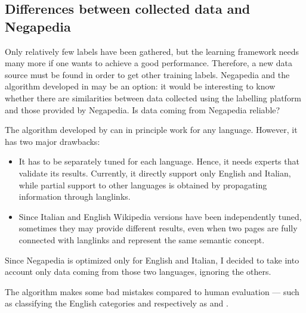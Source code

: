         \subsection{Differences between collected data and Negapedia}
            Only relatively few labels have been gathered, but the learning framework needs many more if one wants to achieve a good performance. Therefore, a new data source must be found in order to get other training labels. Negapedia and the algorithm developed in \cite{Bonetti} may be an option: it would be interesting to know whether there are similarities between data collected using the labelling platform and those provided by Negapedia. Is data coming from Negapedia reliable?
            
            The algorithm developed by \citeauthor{Bonetti} can in principle work for any language. However, it has two major drawbacks:
            \begin{itemize}
                \item It has to be separately tuned for each language. Hence, it needs experts that validate its results. Currently, it directly support only English and Italian, while partial support to other languages is obtained by propagating information through langlinks.
                \item Since Italian and English Wikipedia versions have been independently tuned, sometimes they may provide different results, even when two pages are fully connected with langlinks and represent the same semantic concept.
            \end{itemize}
            
            Since Negapedia is optimized only for English and Italian, I decided to take into account only data coming from those two languages, ignoring the others.
            
            The algorithm makes some bad mistakes compared to human evaluation --- such as classifying the English categories  and  respectively as  and .
            
